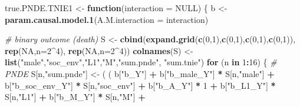 \documentclass[
]{book}
\newenvironment{Shaded}{\begin{snugshade}}{\end{snugshade}}
\newcommand{\AttributeTok}[1]{\textcolor[rgb]{0.13,0.29,0.53}{#1}}
\newcommand{\CommentTok}[1]{\textcolor[rgb]{0.56,0.35,0.01}{\textit{#1}}}
\newcommand{\ConstantTok}[1]{\textcolor[rgb]{0.56,0.35,0.01}{#1}}
\newcommand{\ControlFlowTok}[1]{\textcolor[rgb]{0.13,0.29,0.53}{\textbf{#1}}}
\newcommand{\DecValTok}[1]{\textcolor[rgb]{0.00,0.00,0.81}{#1}}
\newcommand{\FunctionTok}[1]{\textcolor[rgb]{0.13,0.29,0.53}{\textbf{#1}}}
\newcommand{\NormalTok}[1]{#1}
\newcommand{\OtherTok}[1]{\textcolor[rgb]{0.56,0.35,0.01}{#1}}
\newcommand{\SpecialCharTok}[1]{\textcolor[rgb]{0.81,0.36,0.00}{\textbf{#1}}}
\newcommand{\StringTok}[1]{\textcolor[rgb]{0.31,0.60,0.02}{#1}}
\begin{document}
\begin{Shaded}
\begin{Highlighting}[]
\NormalTok{true.PNDE.TNIE1 }\OtherTok{\textless{}{-}} \ControlFlowTok{function}\NormalTok{(}\AttributeTok{interaction =} \ConstantTok{NULL}\NormalTok{) \{}
\NormalTok{  b }\OtherTok{\textless{}{-}} \FunctionTok{param.causal.model.1}\NormalTok{(}\AttributeTok{A.M.interaction =}\NormalTok{ interaction)}
  
  \CommentTok{\# binary outcome (death)}
\NormalTok{  S }\OtherTok{\textless{}{-}} \FunctionTok{cbind}\NormalTok{(}\FunctionTok{expand.grid}\NormalTok{(}\FunctionTok{c}\NormalTok{(}\DecValTok{0}\NormalTok{,}\DecValTok{1}\NormalTok{),}\FunctionTok{c}\NormalTok{(}\DecValTok{0}\NormalTok{,}\DecValTok{1}\NormalTok{),}\FunctionTok{c}\NormalTok{(}\DecValTok{0}\NormalTok{,}\DecValTok{1}\NormalTok{),}\FunctionTok{c}\NormalTok{(}\DecValTok{0}\NormalTok{,}\DecValTok{1}\NormalTok{)), }\FunctionTok{rep}\NormalTok{(}\ConstantTok{NA}\NormalTok{,}\AttributeTok{n=}\DecValTok{2}\SpecialCharTok{\^{}}\DecValTok{4}\NormalTok{), }\FunctionTok{rep}\NormalTok{(}\ConstantTok{NA}\NormalTok{,}\AttributeTok{n=}\DecValTok{2}\SpecialCharTok{\^{}}\DecValTok{4}\NormalTok{))}
  \FunctionTok{colnames}\NormalTok{(S) }\OtherTok{\textless{}{-}} \FunctionTok{list}\NormalTok{(}\StringTok{"male"}\NormalTok{,}\StringTok{"soc\_env"}\NormalTok{,}\StringTok{"L1"}\NormalTok{,}\StringTok{"M"}\NormalTok{,}\StringTok{"sum.pnde"}\NormalTok{, }\StringTok{"sum.tnie"}\NormalTok{)}
  \ControlFlowTok{for}\NormalTok{ (n }\ControlFlowTok{in} \DecValTok{1}\SpecialCharTok{:}\DecValTok{16}\NormalTok{) \{}
    \CommentTok{\# PNDE }
\NormalTok{    S[n,}\StringTok{"sum.pnde"}\NormalTok{] }\OtherTok{\textless{}{-}}\NormalTok{ ( ( b[}\StringTok{"b\_Y"}\NormalTok{] }\SpecialCharTok{+} 
\NormalTok{                             b[}\StringTok{"b\_male\_Y"}\NormalTok{] }\SpecialCharTok{*}\NormalTok{ S[n,}\StringTok{"male"}\NormalTok{] }\SpecialCharTok{+} 
\NormalTok{                             b[}\StringTok{"b\_soc\_env\_Y"}\NormalTok{] }\SpecialCharTok{*}\NormalTok{ S[n,}\StringTok{"soc\_env"}\NormalTok{] }\SpecialCharTok{+} 
\NormalTok{                             b[}\StringTok{"b\_A\_Y"}\NormalTok{] }\SpecialCharTok{*} \DecValTok{1} \SpecialCharTok{+} 
\NormalTok{                             b[}\StringTok{"b\_L1\_Y"}\NormalTok{] }\SpecialCharTok{*}\NormalTok{ S[n,}\StringTok{"L1"}\NormalTok{] }\SpecialCharTok{+}
\NormalTok{                             b[}\StringTok{"b\_M\_Y"}\NormalTok{] }\SpecialCharTok{*}\NormalTok{ S[n,}\StringTok{"M"}\NormalTok{] }\SpecialCharTok{+}

\end{Highlighting}
\end{Shaded}
\end{document}
